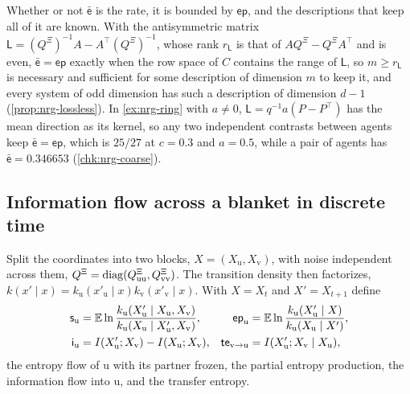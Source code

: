 Whether or not $\bar{\mathsf e}$ is the rate, it is bounded by $\mathsf{ep}$, and the descriptions that keep all of it are known. With the antisymmetric matrix $\mathsf L=(Q^{\Xi})^{-1}A-A^\top(Q^{\Xi})^{-1}$, whose rank $r_{\mathsf L}$ is that of $AQ^{\Xi}-Q^{\Xi}A^\top$ and is even, $\bar{\mathsf e}=\mathsf{ep}$ exactly when the row space of $C$ contains the range of $\mathsf L$, so $m\ge r_{\mathsf L}$ is necessary and sufficient for some description of dimension $m$ to keep it, and every system of odd dimension has such a description of dimension $d-1$ (\cref{prop:nrg-lossless}). In \cref{ex:nrg-ring} with $a\ne0$, $\mathsf L=q^{-1}a(P-P^\top)$ has the mean direction as its kernel, so any two independent contrasts between agents keep $\bar{\mathsf e}=\mathsf{ep}$, which is $25/27$ at $c=0.3$ and $a=0.5$, while a pair of agents has $\bar{\mathsf e}=0.346653$ (\cref{chk:nrg-coarse}).

\subsection{Information flow across a blanket in discrete time}\label{sec:nrg-flow}

Split the coordinates into two blocks, $X=(X_{\mathrm u},X_{\mathrm v})$, with noise independent across them, $Q^{\Xi}=\operatorname{diag}(Q^{\Xi}_{\mathrm{uu}},Q^{\Xi}_{\mathrm{vv}})$. The transition density then factorizes, $k(x'\mid x)=k_{\mathrm u}(x'_{\mathrm u}\mid x)k_{\mathrm v}(x'_{\mathrm v}\mid x)$. With $X=X_t$ and $X'=X_{t+1}$ define
\begin{align}
\mathsf s_{\mathrm u}&=\mathbb{E}\ln\frac{k_{\mathrm u}(X'_{\mathrm u}\mid X_{\mathrm u},X_{\mathrm v})}{k_{\mathrm u}(X_{\mathrm u}\mid X'_{\mathrm u},X_{\mathrm v})},&
\mathsf{ep}_{\mathrm u}&=\mathbb{E}\ln\frac{k_{\mathrm u}(X'_{\mathrm u}\mid X)}{k_{\mathrm u}(X_{\mathrm u}\mid X')},\label{eq:nrg-flows}\\
\mathsf i_{\mathrm u}&=I(X'_{\mathrm u};X_{\mathrm v})-I(X_{\mathrm u};X_{\mathrm v}),&
\mathsf{te}_{\mathrm v\to\mathrm u}&=I(X'_{\mathrm u};X_{\mathrm v}\mid X_{\mathrm u}),\label{eq:nrg-info}
\end{align}
the entropy flow of $\mathrm u$ with its partner frozen, the partial entropy production, the information flow into $\mathrm u$, and the transfer entropy.


